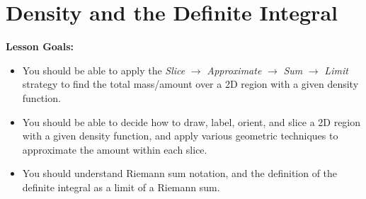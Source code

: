 \documentclass[main]{subfiles}
\begin{document}
\ifSubfilesClassLoaded{%
  \chaptermark{\chapterone}
}{}

\section{Density and the Definite Integral} \label{ws1-2}

\begin{framed}
\textbf{Lesson Goals:}
\begin{itemize}
\item You should be able to apply the \textit{Slice} $\rightarrow$ \textit{Approximate} $\rightarrow$ \textit{Sum} $\rightarrow$ \textit{Limit} strategy to find the total mass/amount over a 2D region with a given density function.
\item You should be able to decide how to draw, label, orient, and slice a 2D region with a given density function, and apply various geometric techniques to approximate the amount within each slice.
\item You should understand Riemann sum notation, and the definition of the definite integral as a limit of a Riemann sum.
\end{itemize}


\end{framed}
\end{document}
